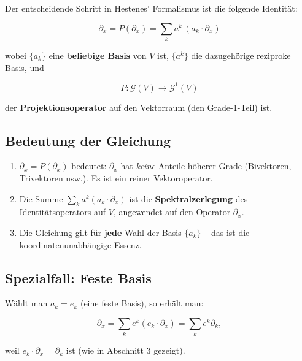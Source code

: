 \documentclass[11pt]{article}
\begin{document}
Der entscheidende Schritt in Hestenes' Formalismus ist die folgende Identität:

\[
\boxed{
\partial_x = P(\partial_x) = \sum_k a^k \, (a_k \cdot \partial_x)
}
\]

wobei \(\{a_k\}\) eine \textbf{beliebige Basis} von \(V\) ist, \(\{a^k\}\) die dazugehörige reziproke Basis, und

\[
P: \mathcal G(V) \longrightarrow \mathcal G^1(V)
\]

der \textbf{Projektionsoperator} auf den Vektorraum (den Grade-1-Teil) ist.

\begin{center}
\end{center}

\subsection{Bedeutung der Gleichung}

\begin{enumerate}
    \item \(\partial_x = P(\partial_x)\) bedeutet: \(\partial_x\) hat \emph{keine} Anteile höherer Grade (Bivektoren, Trivektoren usw.). Es ist ein reiner Vektoroperator.
    \item Die Summe \(\sum_k a^k (a_k \cdot \partial_x)\) ist die \textbf{Spektralzerlegung} des Identitätsoperators auf \(V\), angewendet auf den Operator \(\partial_x\).
    \item Die Gleichung gilt für \textbf{jede} Wahl der Basis \(\{a_k\}\) – das ist die koordinatenunabhängige Essenz.
\end{enumerate}

\subsection{Spezialfall: Feste Basis}

Wählt man \(a_k = e_k\) (eine feste Basis), so erhält man:

\[
\partial_x = \sum_k e^k (e_k \cdot \partial_x) = \sum_k e^k \partial_k,
\]

weil \(e_k \cdot \partial_x = \partial_k\) ist (wie in Abschnitt 3 gezeigt).
\end{document}
